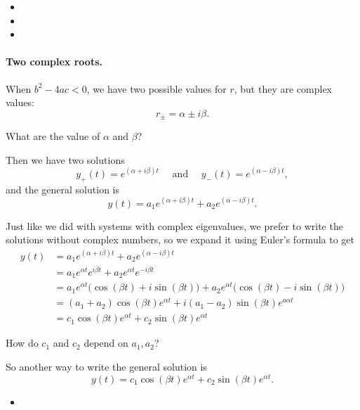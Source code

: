 \begin{video}
\begin{itemize}
	\item {}
	\item {}
	\item {}
\end{itemize}	
\end{video}



\paragraph{\color{cyan}Two complex roots.} When $b^2-4ac<0$, we have two possible values for $r$, but they are complex values:
$$
r_{\pm} = \alpha \pm i\beta.
$$
\begin{graybox}
What are the value of $\alpha$ and $\beta$?	
\end{graybox}

Then we have two solutions
$$
y_{+}(t) = e^{(\alpha+i\beta) t} \quad \text{ and } \quad y_{-}(t) = e^{(\alpha-i\beta) t},
$$
and the general solution is
$$
y(t) = a_1 e^{(\alpha+i\beta) t}  + a_2 e^{(\alpha-i\beta) t}.
$$

Just like we did with systems with complex eigenvalues, we prefer to write the solutions without complex numbers, so we expand it using Euler's formula to get
\begin{align*}
y(t) 	& = a_1 e^{(\alpha+i\beta) t}  + a_2 e^{(\alpha-i\beta) t} \\
		& = a_1 e^{\alpha t}e^{i\beta t}  + a_2 e^{\alpha t}e^{-i\beta t} \\
		& = a_1 e^{\alpha t} \big( \cos(\beta t) + i \sin(\beta t) \big)  + a_2 e^{\alpha t} \big( \cos(\beta t) - i \sin(\beta t) \big) \\
		& = (a_1+a_2)  \cos(\beta t)e^{\alpha t} + i (a_1-a_2)\sin(\beta t) e^{a\alpha t} \\
		& = c_1 \cos(\beta t)e^{\alpha t} + c_2\sin(\beta t) e^{\alpha t}
\end{align*}

\begin{graybox}
How do $c_1$ and $c_2$ depend on $a_1,a_2$?	
\end{graybox}

So another way to write the general solution is
$$
y(t) = c_1 \cos(\beta t)e^{\alpha t} + c_2\sin(\beta t) e^{\alpha t}.
$$


\begin{video}
\begin{itemize}
	\item {}
\end{itemize}	
\end{video}




